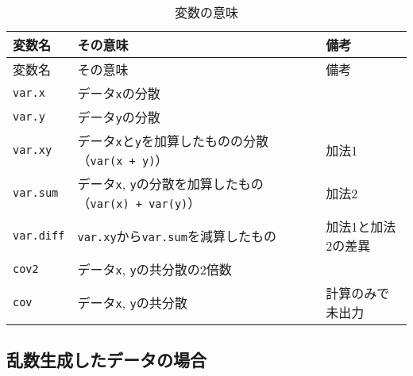 \documentclass[a4paper]{tufte-handout}
\begin{document}
\newpage

\begin{longtable}[]{@{}lll@{}}
\caption{変数の意味}\tabularnewline
\toprule
変数名 & その意味 & 備考 \\
\midrule
\endfirsthead
\toprule
変数名 & その意味 & 備考 \\
\midrule
\endhead
\texttt{var.x} & データ\texttt{x}の分散 & \\
\texttt{var.y} & データ\texttt{y}の分散 & \\
\texttt{var.xy} &
データ\texttt{x}と\texttt{y}を加算したものの分散（\texttt{var(x\ +\ y)}）
& 加法1 \\
\texttt{var.sum} & データ\texttt{x},
\texttt{y}の分散を加算したもの（\texttt{var(x)\ +\ var(y)}） & 加法2 \\
\texttt{var.diff} & \texttt{var.xy}から\texttt{var.sum}を減算したもの &
加法1と加法2の差異 \\
\texttt{cov2} & データ\texttt{x}, \texttt{y}の共分散の2倍数 & \\
\texttt{cov} & データ\texttt{x}, \texttt{y}の共分散 &
計算のみで未出力 \\
\bottomrule
\end{longtable}

\newpage

\hypertarget{ux4e71ux6570ux751fux6210ux3057ux305fux30c7ux30fcux30bfux306eux5834ux5408}{%
\subsection{\texorpdfstring{\textbf{乱数生成したデータの場合}}{乱数生成したデータの場合}}\label{ux4e71ux6570ux751fux6210ux3057ux305fux30c7ux30fcux30bfux306eux5834ux5408}}
\end{document}

